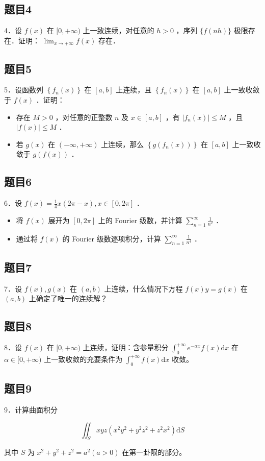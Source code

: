 \documentclass{article}
\begin{document}
\subsection{题目4}
4．设 \(f(x)\) 在 \([0,+\infty)\) 上一致连续，对任意的 \(h>0\) ，序列 \(\{f(n h)\}\) 极限存在．证明： \(\lim _{x \rightarrow+\infty} f(x)\) 存在．

\subsection{题目5}
5．设函数列 \(\left\{f_{n}(x)\right\}\) 在 \([a, b]\) 上连续，且 \(\left\{f_{n}(x)\right\}\) 在 \([a, b]\) 上一致收敛于 \(f(x)\) ．证明：

\begin{itemize}
  \item[（1）] 存在 \(M>0\) ，对任意的正整数 \(n\) 及 \(x \in[a, b]\) ，有 \(\left|f_{n}(x)\right| \leq M\) ，且 \(|f(x)| \leq M\) ．
  \item[（2）] 若 \(g(x)\) 在 \((-\infty,+\infty)\) 上连续，那么 \(\left\{g\left(f_{n}(x)\right)\right\}\) 在 \([a, b]\) 上一致收敛于 \(g(f(x))\) ．
\end{itemize}

\subsection{题目6}
6．设 \(f(x)=\frac{1}{4} x(2 \pi-x), x \in[0,2 \pi]\) ．

\begin{itemize}
  \item[（1）] 将 \(f(x)\) 展开为 \([0,2 \pi]\) 上的 Fourier 级数，并计算 \(\sum_{n=1}^{\infty} \frac{1}{n^{2}}\) ．
  \item[（2）] 通过将 \(f(x)\) 的 Fourier 级数逐项积分，计算 \(\sum_{n=1}^{\infty} \frac{1}{n^{4}}\) ．
\end{itemize}

\subsection{题目7}
7．设 \(f(x), g(x)\) 在 \((a, b)\) 上连续，什么情况下方程 \(f(x) y=g(x)\) 在 \((a, b)\) 上确定了唯一的连续解？

\subsection{题目8}
8．设 \(f(x)\) 在 \([0,+\infty)\) 上连续，证明：含参量积分 \(\int_{0}^{+\infty} e^{-\alpha x} f(x) \mathrm{d} x\) 在 \(\alpha \in[0,+\infty)\) 上一致收敛的充要条件为 \(\int_{0}^{+\infty} f(x) \mathrm{d} x\) 收敛。

\subsection{题目9}
9．计算曲面积分

\[
\iint_{S} x y z\left(x^{2} y^{2}+y^{2} z^{2}+z^{2} x^{2}\right) \mathrm{d} S
\]

其中 \(S\) 为 \(x^{2}+y^{2}+z^{2}=a^{2}(a>0)\) 在第一卦限的部分。
\end{document}
